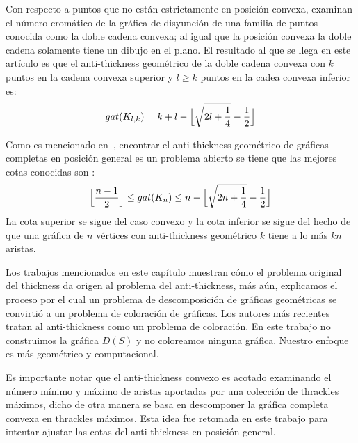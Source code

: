 Con respecto a puntos que no están estrictamente en posición convexa, \cite{Lomeli2018}
examinan el número cromático de la gráfica de disyunción de una familia de puntos
conocida como la doble cadena convexa; al igual que la posición convexa la doble cadena
solamente tiene un dibujo en el plano. El resultado al que se llega en este artículo es que
el anti-thickness geométrico de la doble cadena convexa con $k$ puntos en la cadena convexa superior
y $l \geq k$ puntos en la cadea convexa inferior es:
 \[gat(K_{l,k}) = k+l-\Bigl\lfloor \sqrt{2l+\frac{1}{4}} - \frac{1}{2} \Bigr\rfloor\]

 Como es mencionado en~\cite{Dujmovic2017}, encontrar el anti-thickness geométrico de gráficas
 completas en posición general es un problema abierto se tiene que las mejores cotas conocidas
 son :
 \[\Bigl\lfloor\frac{n-1}{2}\Bigr\rfloor \leq gat(K_n) \leq n - \Bigl\lfloor \sqrt{2n + \frac{1}{4}} - \frac{1}{2} \Bigr\rfloor \]
 La cota superior se sigue del caso convexo y la cota inferior se sigue del hecho de que una gráfica de $n$ vértices
con anti-thickness geométrico $k$ tiene a lo más $kn$ aristas.

Los trabajos mencionados en este capítulo muestran cómo el problema original del
thickness da origen al problema del anti-thickness, más aún, explicamos el proceso
por el cual un problema de descomposición de gráficas geométricas se convirtió
a un problema de coloración de gráficas. Los autores más recientes tratan al
anti-thickness como un problema de coloración. En este trabajo no construimos la
gráfica $D(S)$ y no coloreamos ninguna gráfica. Nuestro enfoque es más geométrico
y computacional.

Es importante notar que el anti-thickness convexo es acotado examinando el número mínimo
y máximo de aristas aportadas por una colección de thrackles máximos, dicho de
otra manera se basa en descomponer la gráfica completa convexa en thrackles máximos.
Esta idea fue retomada en este trabajo para intentar ajustar las cotas del anti-thickness
en posición general.
